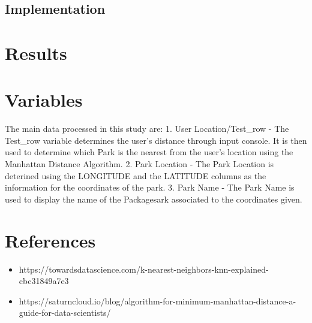 \documentclass[letterpaper, 12pt]{article}
\begin{document}
        \subsection*{Implementation}
            \par 
    \section*{Results}    %
    \section*{Variables}
    \begin{itemize}
        The main data processed in this study are:
        1. User Location/Test_row - The Test_row variable determines the user's distance through input console. It is then used to determine which Park is the nearest from the user's location using the Manhattan Distance Algorithm. 
        2. Park Location - The Park Location is deterined using the LONGITUDE and the LATITUDE columns as the information for the coordinates of the park.
        3. Park Name - The Park Name is used to display the name of the Packagesark associated to the coordinates given.
    \end{itemize}
    \section*{References}
    \begin{itemize}
        \item https://towardsdatascience.com/k-nearest-neighbors-knn-explained-cbc31849a7e3
        \item https://saturncloud.io/blog/algorithm-for-minimum-manhattan-distance-a-guide-for-data-scientists/
    \end{itemize}
\end{document}
